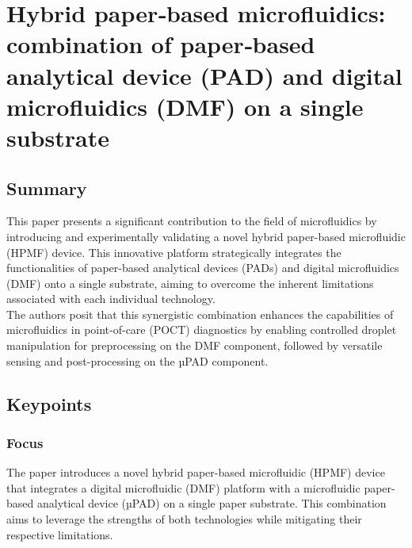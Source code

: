 \chapter[Hybrid paper‑based microfluidics]{Hybrid paper‑based microfluidics: combination of paper‑based analytical device (\textmugreek PAD) and digital microfluidics (DMF) on a single substrate}

\section{Summary}
This paper presents a significant contribution to the field of microfluidics by introducing and experimentally validating a novel hybrid paper-based microfluidic (HPMF) device. This innovative platform strategically integrates the functionalities of paper-based analytical devices (\textmugreek PADs) and digital microfluidics (DMF) onto a single substrate, aiming to overcome the inherent limitations associated with each individual technology.\\

The authors posit that this synergistic combination enhances the capabilities of microfluidics in point-of-care (POCT) diagnostics by enabling controlled droplet manipulation for preprocessing on the DMF component, followed by versatile sensing and post-processing on the µPAD component.

\section{Keypoints}
\subsection{Focus}
The paper introduces a novel hybrid paper-based microfluidic (HPMF) device that integrates a digital microfluidic (DMF) platform with a microfluidic paper-based analytical device (µPAD) on a single paper substrate. This combination aims to leverage the strengths of both technologies while mitigating their respective limitations. \newpage
